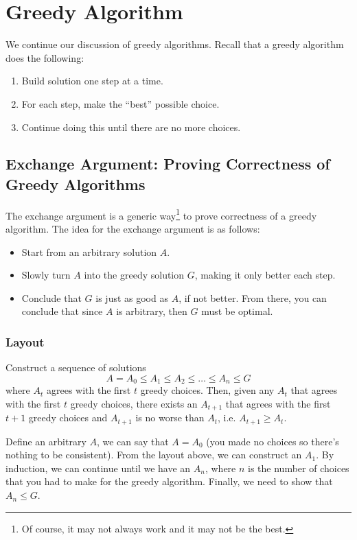 \documentclass[letterpaper]{article}
\begin{document}
\section{Greedy Algorithm}
We continue our discussion of greedy algorithms. Recall that a greedy algorithm does the following: 
\begin{enumerate}
    \item Build solution one step at a time.
    \item For each step, make the ``best'' possible choice. 
    \item Continue doing this until there are no more choices. 
\end{enumerate}


\subsection{Exchange Argument: Proving Correctness of Greedy Algorithms}
The exchange argument is a generic way\footnote{Of course, it may not always work and it may not be the best.} to prove correctness of a greedy algorithm. The idea for the exchange argument is as follows: 
\begin{itemize}
    \item Start from an arbitrary solution $A$. 
    \item Slowly turn $A$ into the greedy solution $G$, making it only better each step. 
    \item Conclude that $G$ is just as good as $A$, if not better. From there, you can conclude that since $A$ is arbitrary, then $G$ must be optimal. 
\end{itemize}

\subsubsection{Layout}
Construct a sequence of solutions 
\[A = A_0 \leq A_1 \leq A_2 \leq \dots \leq A_n \leq G\]
where $A_t$ agrees with the first $t$ greedy choices. Then, given any $A_t$ that agrees with the first $t$ greedy choices, there exists an $A_{t + 1}$ that agrees with the first $t + 1$ greedy choices and $A_{t + 1}$ is no worse than $A_t$, i.e. $A_{t + 1} \geq A_t$.

\bigskip 

Define an arbitrary $A$, we can say that $A = A_0$ (you made no choices so there's nothing to be consistent). From the layout above, we can construct an $A_1$. By induction, we can continue until we have an $A_n$, where $n$ is the number of choices that you had to make for the greedy algorithm. Finally, we need to show that $A_n \leq G$. 
\end{document}
